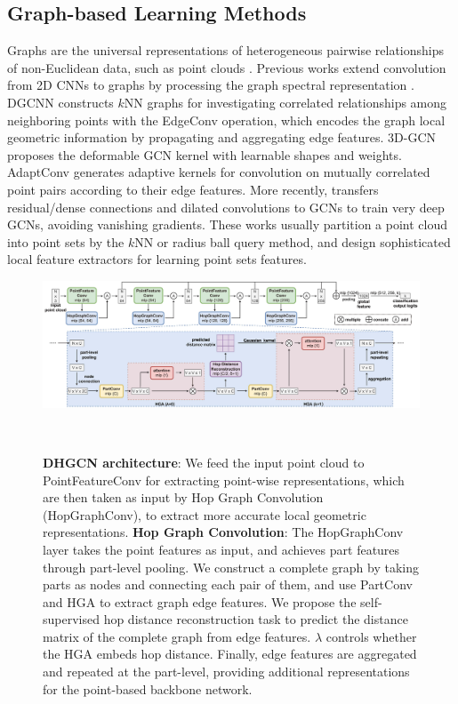 \documentclass[letterpaper]{article}
\begin{document}
\subsection{Graph-based Learning Methods}
Graphs are the universal representations of heterogeneous pairwise relationships of non-Euclidean data, such as point clouds \cite{defferrard2016convolutional}. Previous works extend convolution from 2D CNNs to graphs by processing the graph spectral representation \cite{defferrard2016convolutional,kipf2016semi}.
DGCNN \cite{dgcnn} constructs \(k\)NN graphs for investigating correlated relationships among neighboring points with the EdgeConv operation, which encodes the graph local geometric information by propagating and aggregating edge features.
3D-GCN \cite{3dgcn} proposes the deformable GCN kernel with learnable shapes and weights.
AdaptConv \cite{adaptconv} generates adaptive kernels for convolution on mutually correlated point pairs according to their edge features.
More recently, \citet{deepgcns} transfers residual/dense connections and dilated convolutions to GCNs to train very deep GCNs, avoiding vanishing gradients.
These works usually partition a point cloud into point sets by the \(k\)NN or radius ball query method, and design sophisticated local feature extractors for learning point sets features.


\begin{figure}[htbp]
\centering
\begin{minipage}[b]{1.0\linewidth}
\begin{center}
\includegraphics[width=1.0\linewidth]{images/hop_overview.jpg}
\end{center}
\end{minipage}\\
\caption{
\textbf{DHGCN architecture}:
We feed the input point cloud to PointFeatureConv for extracting point-wise representations, which are then taken as input by Hop Graph Convolution (HopGraphConv), to extract more accurate local geometric representations.
\textbf{Hop Graph Convolution}:
The HopGraphConv layer takes the point features as input, and achieves part features through part-level pooling.
We construct a complete graph by taking parts as nodes and connecting each pair of them, and use PartConv and HGA to extract graph edge features.
We propose the self-supervised hop distance reconstruction task to predict the distance matrix of the complete graph from edge features.
\(\lambda\) controls whether the HGA embeds hop distance.
Finally, edge features are aggregated and repeated at the part-level, providing additional representations for the point-based backbone network.
}
\label{fig:netarchi}
\end{figure}
\end{document}
